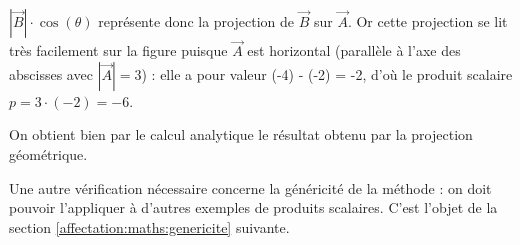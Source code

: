 \noindent\begin{minipage}{10cm}
$|\vec{B}| \cdot \cos(\theta)$ représente donc la projection de $\vec{B}$
sur $\vec{A}$. Or cette projection se lit très facilement sur la figure
puisque $\vec{A}$ est horizontal (parallèle à l'axe des abscisses avec 
$|\vec{A}| = 3$) : elle a pour valeur (-4) - (-2) = -2, 
d'où le produit scalaire $p = 3 \cdot (-2) = -6$.
\vspace*{2mm}
\end{minipage}
\hfill
\begin{minipage}{5cm}
\end{minipage}

\noindent On obtient bien par le calcul analytique 
le résultat obtenu par la projection géométrique.

Une autre vérification nécessaire concerne la généricité de la méthode : 
on doit pouvoir l'appliquer à d'autres exemples de produits scalaires.
C'est l'objet de la section \ref{affectation:maths:genericite} suivante.

